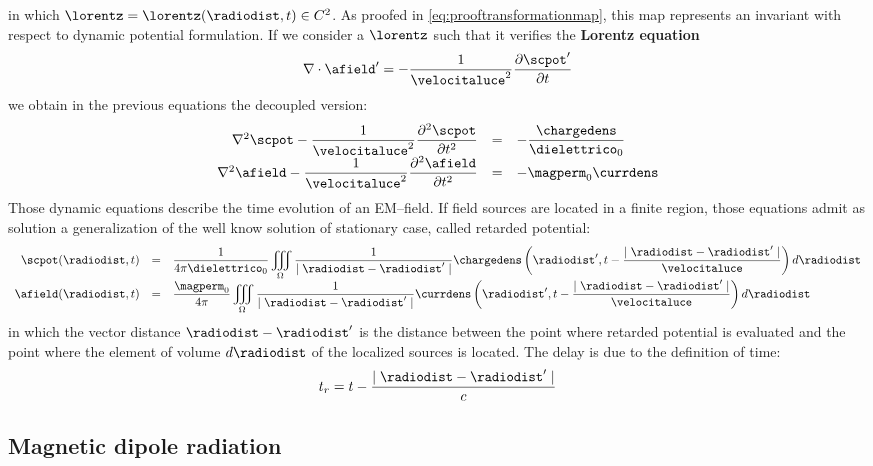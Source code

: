in which $\lorentz = \lorentz(\radiodist,t) \in C^2$. As proofed in \ref{eq:prooftransformationmap}, this map represents an invariant with respect to dynamic potential formulation. If we consider a $\lorentz$ such that it verifies the \textbf{Lorentz equation}
\begin{equation}
\nabla \cdot \afield' = - \dfrac{1}{\velocitaluce^2} \partialtarg{\scpot'}
\end{equation}
we obtain in the previous equations the decoupled version:
\begin{equation}
\begin{array}{rcl}
\nabla^2 \scpot - \dfrac{1}{\velocitaluce^2} \partialttarg{\scpot} & = & - \dfrac{\chargedens}{\dielettrico_0} \\
\nabla^2 \afield - \dfrac{1}{\velocitaluce^2} \partialttarg{\afield} & = & - \magperm_0 \currdens 
\end{array}
\end{equation}
Those dynamic equations describe the time evolution of an EM--field. If field sources are located in a finite region, those equations admit as solution a generalization of the well know solution of stationary case, called retarded potential:
\begin{equation}
\begin{array}{rcl}
\scpot(\radiodist,t) & = & \dfrac{1}{4\pi \dielettrico_0} \displaystyle\iiint\limits_{\Omega} \dfrac{1}{\mid \radiodist - \radiodist' \mid} \chargedens\left( \radiodist',t-\dfrac{\mid \radiodist - \radiodist' \mid}{\velocitaluce} \right) d\radiodist   \\
\afield(\radiodist,t) & = & \dfrac{\magperm_0}{4\pi} \displaystyle\iiint\limits_{\Omega} \dfrac{1}{\mid \radiodist - \radiodist' \mid} \currdens\left( \radiodist',t-\dfrac{\mid \radiodist - \radiodist' \mid}{\velocitaluce} \right) d\radiodist 
\end{array}
\end{equation}
in which the vector distance ${\radiodist - \radiodist'}$ is the distance between the point where retarded potential is evaluated and the point where the element of volume $d\radiodist$ of the localized sources is located. The delay is due to the definition of time:
\[
t_r = t - \dfrac{\mid \radiodist - \radiodist' \mid}{c}
\]

\subsection{Magnetic dipole radiation}

